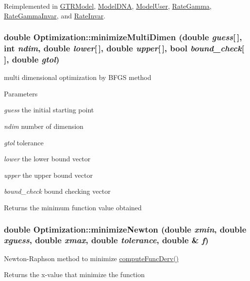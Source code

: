 Reimplemented in \hyperlink{classGTRModel_a6e2066898fbbb245596d4a97dd8ee33c}{GTRModel}, \hyperlink{classModelDNA_adc73fda51fb0f02049ed891b29c3a951}{ModelDNA}, \hyperlink{classModelUser_ad5a88a6c25475b8bb0ea778f4c40cf3b}{ModelUser}, \hyperlink{classRateGamma_af271c0115c8a81ff6fac32d1cfef6187}{RateGamma}, \hyperlink{classRateGammaInvar_a4f276d1639a79eece217b365439049c7}{RateGammaInvar}, and \hyperlink{classRateInvar_a3ffa388d5aa7f56bb2c047c35bc3b453}{RateInvar}.\hypertarget{classOptimization_a2e263d2334c328f6a0a8429bc901a42b}{
\subsubsection[{minimizeMultiDimen}]{\setlength{\rightskip}{0pt plus 5cm}double Optimization::minimizeMultiDimen (double {\em guess}\mbox{[}$\,$\mbox{]}, \/  int {\em ndim}, \/  double {\em lower}\mbox{[}$\,$\mbox{]}, \/  double {\em upper}\mbox{[}$\,$\mbox{]}, \/  bool {\em bound\_\-check}\mbox{[}$\,$\mbox{]}, \/  double {\em gtol})}}
\label{classOptimization_a2e263d2334c328f6a0a8429bc901a42b}
multi dimensional optimization by BFGS method 
\begin{DoxyParams}{Parameters}
\item[{\em guess}]the initial starting point \item[{\em ndim}]number of dimension \item[{\em gtol}]tolerance \item[{\em lower}]the lower bound vector \item[{\em upper}]the upper bound vector \item[{\em bound\_\-check}]bound checking vector \end{DoxyParams}
\begin{DoxyReturn}{Returns}
the minimum function value obtained 
\end{DoxyReturn}
\hypertarget{classOptimization_a32d3810b12230f4201e03ea25f0320ec}{
\subsubsection[{minimizeNewton}]{\setlength{\rightskip}{0pt plus 5cm}double Optimization::minimizeNewton (double {\em xmin}, \/  double {\em xguess}, \/  double {\em xmax}, \/  double {\em tolerance}, \/  double \& {\em f})}}
\label{classOptimization_a32d3810b12230f4201e03ea25f0320ec}
Newton-\/Raphson method to minimize \hyperlink{classOptimization_a18bedacde6fd259ff5923c9e936464bd}{computeFuncDerv()} \begin{DoxyReturn}{Returns}
the x-\/value that minimize the function 
\end{DoxyReturn}

